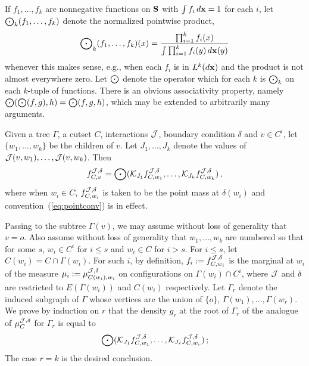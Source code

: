 \begin{defn}
If $f_1 , \ldots , f_k$ are nonnegative functions on $\S$ with
$\int f_i \, \dx = 1$ for each $i$, 
let \hfill \\ $\poi_k (f_1 , \ldots , f_k)$ 
denote the normalized pointwise product, 
$$\poi_k (f_1 , \ldots , f_k) (x) = {\prod_{i=1}^k f_i (x) \over
   \int \prod_{i=1}^k f_i (y) \, \dx (y)}$$
whenever this makes sense, e.g., when each $f_i$ is in $L^k (\dx)$
and the product is not almost everywhere zero.  Let $\poi$ denote
the operator which for each $k$ is $\poi_k$ on each $k$-tuple of functions.
There is an obvious associativity property, namely $\poi (\poi (f,g) , h)
= \poi (f,g,h)$, which may be extended to arbitrarily many arguments.
\end{defn}

\begin{lem} \label{lem:rec}
Given a tree $\Gamma$, a cutset $C$, interactions $\J$, boundary condition
$\delta$ and $v\in C^i$, 
let $\{ w_1 , \ldots , w_k \}$ be the children of $v$.  Let $J_1 , \ldots , 
J_k$ denote the values of $\J (v , w_1) , \ldots , \J (v , w_k)$.  Then 
\begin{equation} \label{eq:recurse}
f_{C,v}^{\J,\dd} = \poi (\K_{J_1} f^{\J , \delta}_{C , w_1} , 
   \ldots , \K_{J_k} f^{\J , \delta}_{C , w_k}) \, ,
\end{equation} 
where when $w_i\in C$, $f^{\J , \delta}_{C , w_i}$ is taken to be the point
mass at $\delta(w_i)$ and convention~(\ref{eq:pointconv}) is in effect.
\end{lem}

Passing to the subtree $\Gamma (v)$, we may assume without loss of
generality that $v = o$.  Also assume without loss of generality that
$w_1 , \ldots , w_k$ are numbered so that
for some $s$, $w_i \in C^i$ for $i \leq s$ and $w_i \in C$ for $i > s$.
For $i\le s$, let $C(w_i) = C \cap \Gamma (w_i)$.  For such $i$, by 
definition, $f_i := f^{\J , \dd}_{C,w_i}$ is the marginal at $w_i$ 
of the measure $\mu_i := \mu^{\J, \dd}_{C(w_i) , w_i}$ on 
configurations on $\Gamma (w_i)\cap C^i$, where $\J$ and $\p$ 
are restricted to $E (\Gamma (w_i))$ and $C(w_i)$ respectively.
Let $\Gamma_r$ denote the induced subgraph of $\Gamma$ whose vertices 
are the union of $\{ o \}$, $\Gamma (w_1) , \ldots , \Gamma (w_r)$.
We prove by induction on $r$ that the density $g_r$ at the root of
$\Gamma_r$ of the analogue of $\mu^{\J , \delta}_C$ for $\Gamma_r$ is equal to
$$\poi (\K_{J_1} f^{\J , \delta}_{C , w_1} , \ldots , 
   \K_{J_r} f^{\J , \delta}_{C , w_r}) \, ;$$
The case $r = k$ is the desired conclusion.

